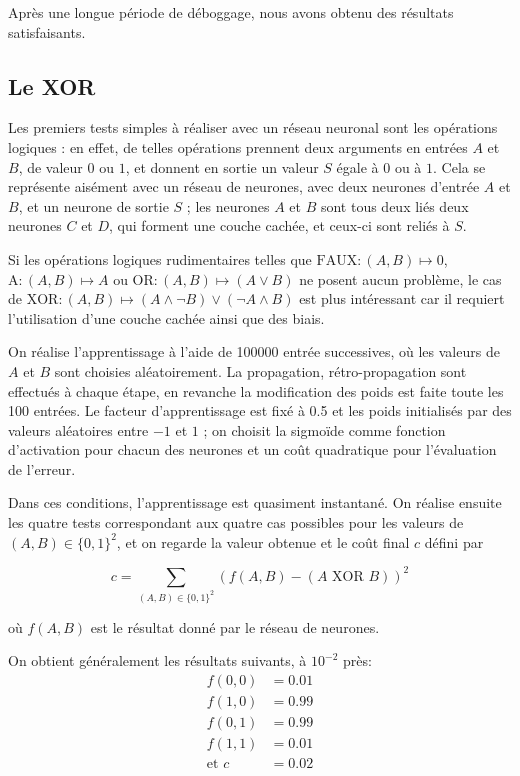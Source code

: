 Après une longue période de déboggage, nous avons obtenu des résultats
satisfaisants.


\subsection{Le XOR}

Les premiers tests simples à réaliser avec un réseau neuronal sont les opérations logiques : en effet, de telles opérations prennent deux arguments en entrées $A$ et $B$, de valeur $0$ ou $1$, et donnent en sortie un valeur $S$ égale à $0$ ou à $1$. Cela se représente aisément avec un réseau de neurones, avec deux neurones d'entrée $A$ et $B$, et un neurone de sortie $S$ ; les neurones $A$ et $B$ sont tous deux liés deux neurones $C$ et $D$, qui forment une couche cachée, et ceux-ci sont reliés à $S$.

Si les opérations logiques rudimentaires telles que $\text{FAUX}: (A, B) \mapsto 0$, $\text{A}: (A, B) \mapsto A$ ou $\text{OR}: (A, B) \mapsto (A ∨ B)$ ne posent aucun problème, le cas de $\text{XOR}: (A, B) \mapsto (A ∧ ¬B) ∨ (¬A ∧ B)$ est plus intéressant car il requiert l'utilisation d'une couche cachée ainsi que des biais.

On réalise l'apprentissage à l'aide de 100000 entrée successives, où les valeurs de $A$ et $B$ sont choisies aléatoirement. La propagation, rétro-propagation sont effectués à chaque étape, en revanche la modification des poids est faite toute les 100 entrées. Le facteur d'apprentissage est fixé à 0.5 et les poids initialisés par des valeurs aléatoires entre $-1$ et $1$ ; on choisit la sigmoïde comme fonction d'activation pour chacun des neurones et un coût quadratique pour l'évaluation de l'erreur.

Dans ces conditions, l'apprentissage est quasiment instantané. On réalise ensuite les quatre tests correspondant aux quatre cas possibles pour les valeurs de $(A, B) \in \{0, 1\}^2$, et on regarde la valeur obtenue et le coût final $c$ défini par

\[ c = \sum_{(A, B) \in \{0, 1\}^2} (f(A, B) - (A \text{ XOR } B))^2 \]

où $f(A, B)$ est le résultat donné par le réseau de neurones.

On obtient généralement les résultats suivants, à $10^{-2}$ près:
\[\begin{split}
f(0, 0) &= 0.01 \\
f(1, 0) &= 0.99 \\
f(0, 1) &= 0.99 \\
f(1, 1) &= 0.01 \\
\text{et }c &= 0.02
\end{split}\]

